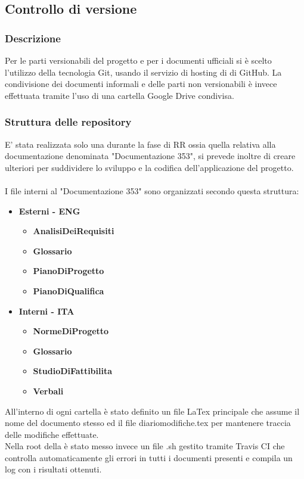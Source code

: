 \documentclass[NormeDiProgetto.tex]{subfiles}
\begin{document}
	\subsection{Controllo di versione}
	
	\subsubsection{Descrizione}
	Per le parti versionabili del progetto e per i documenti ufficiali si è scelto l'utilizzo della tecnologia Git, usando il servizio di hosting di  di GitHub.
	La condivisione dei documenti informali e delle parti non versionabili è invece effettuata tramite l'uso di una cartella Google Drive condivisa.
	
	\subsubsection{Struttura delle repository}
	E' stata realizzata solo una  durante la fase di RR ossia quella relativa alla documentazione denominata "Documentazione 353", si prevede inoltre di creare ulteriori  per suddividere lo sviluppo e la codifica dell'applicazione del progetto. \\\\
	I file interni al  "Documentazione 353" sono organizzati secondo questa struttura:
	\begin{itemize}
		\item \textbf{Esterni - ENG}
				\begin{itemize}
				\item \textbf{AnalisiDeiRequisiti}
				\item \textbf{Glossario}
				\item \textbf{PianoDiProgetto}
				\item \textbf{PianoDiQualifica}
			\end{itemize}
		\item \textbf{Interni - ITA}
				\begin{itemize}
					\item \textbf{NormeDiProgetto}
					\item \textbf{Glossario}
					\item \textbf{StudioDiFattibilita}
					\item \textbf{Verbali}
				\end{itemize}		
	\end{itemize}	
	All'interno di ogni cartella è stato definito un file LaTex principale che assume il nome del documento stesso ed il file diariomodifiche.tex per mantenere traccia delle modifiche effettuate.\\
	Nella root della  è stato messo invece un file .sh gestito tramite Travis CI che controlla automaticamente gli errori in tutti i documenti presenti e compila un log con i risultati ottenuti.
	
\end{document}
